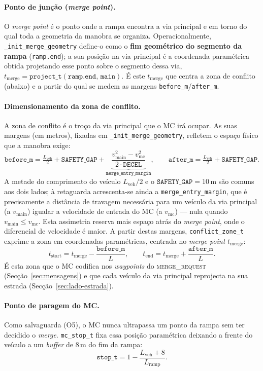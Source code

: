 \documentclass[11pt,a4paper]{article}
\begin{document}
\paragraph{Ponto de junção (\emph{merge point}).} O \emph{merge point} é o ponto onde a
rampa encontra a via principal e em torno do qual toda a geometria da manobra se organiza.
Operacionalmente, \texttt{\_init\_merge\_geometry} define-o como o \textbf{fim geométrico do
segmento da rampa} (\texttt{ramp.end}); a sua posição na via principal é a coordenada
paramétrica obtida projetando esse ponto sobre o segmento dessa via,
$t_{\text{merge}} = \texttt{project\_t}(\texttt{ramp.end},\,\texttt{main})$. É este
$t_{\text{merge}}$ que centra a zona de conflito (abaixo) e a partir do qual se medem as
margens \texttt{before\_m}/\texttt{after\_m}.

\paragraph{Dimensionamento da zona de conflito.} A zona de conflito é o troço da via
principal que o MC irá ocupar. As suas margens (em metros), fixadas em
\texttt{\_init\_merge\_geometry}, refletem o espaço físico que a manobra exige:
\[
  \texttt{before\_m} = \tfrac{L_{\text{veh}}}{2} + \texttt{SAFETY\_GAP}
                       + \underbrace{\frac{v_{\text{main}}^{2} - v_{\text{mc}}^{2}}{2\cdot\texttt{DECEL}}}_{\texttt{merge\_entry\_margin}},
  \qquad
  \texttt{after\_m} = \tfrac{L_{\text{veh}}}{2} + \texttt{SAFETY\_GAP}.
\]
A metade do comprimento do veículo $L_{\text{veh}}/2$ e o $\texttt{SAFETY\_GAP}=10$\,m são comuns aos dois
lados; à retaguarda acrescenta-se ainda a \texttt{merge\_entry\_margin}, que é precisamente a
distância de travagem necessária para um veículo da via principal (a $v_{\text{main}}$)
igualar a velocidade de entrada do MC (a $v_{\text{mc}}$) --- nula quando
$v_{\text{main}}\le v_{\text{mc}}$. Esta assimetria reserva mais espaço atrás do
\emph{merge point}, onde o diferencial de velocidade é maior. A partir destas margens,
\texttt{conflict\_zone\_t} exprime a zona em coordenadas paramétricas, centrada no
\emph{merge point} $t_{\text{merge}}$:
\[
  t_{\text{start}} = t_{\text{merge}} - \frac{\texttt{before\_m}}{L},
  \qquad
  t_{\text{end}}   = t_{\text{merge}} + \frac{\texttt{after\_m}}{L}.
\]
É esta zona que o MC codifica nos \emph{waypoints} do \textsc{merge\_request}
(Secção~\ref{sec:mensagens}) e que cada veículo da via principal reprojecta na sua estrada
(Secção~\ref{sec:lado-estrada}).

\paragraph{Ponto de paragem do MC.} Como salvaguarda (O5), o MC nunca ultrapassa um ponto
da rampa sem ter decidido o \emph{merge}. \texttt{mc\_stop\_t} fixa essa posição
paramétrica deixando a frente do veículo a um \emph{buffer} de $8$\,m do fim da rampa:
\[
  \texttt{stop\_t} = 1 - \frac{L_{\text{veh}} + 8}{L_{\text{ramp}}} .
\]
\end{document}
